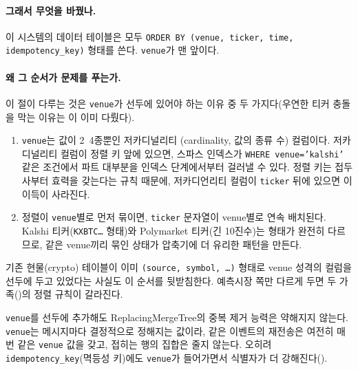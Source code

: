 \paragraph{그래서 무엇을 바꿨나.} 이 시스템의 데이터 테이블은 모두
\texttt{ORDER BY (venue, ticker, time, idempotency\_key)} 형태를 쓴다.
\texttt{venue}가 맨 앞이다.

\paragraph{왜 그 순서가 문제를 푸는가.} 이 절이 다루는 것은 \texttt{venue}가 선두에
있어야 하는 이유 중  두 가지다(우연한 티커 충돌을 막는 이유는
이 이미 다뤘다).

\begin{enumerate}
  \item {} \texttt{venue}는 값이 2~4종뿐인 저카디널리티
    (cardinality, 값의 종류 수) 컬럼이다. 저카디널리티 컬럼이 정렬 키 앞에 있으면,
    스파스 인덱스가 \texttt{WHERE venue='kalshi'} 같은 조건에서 파트 대부분을
    인덱스 단계에서부터 걸러낼 수 있다. 정렬 키는 접두사부터 효력을 갖는다는 규칙
    때문에, 저카디언리티 컬럼이 \texttt{ticker} 뒤에 있으면 이 이득이 사라진다.
  \item {} 정렬이 \texttt{venue}별로 먼저 묶이면, \texttt{ticker}
    문자열이 venue별로 연속 배치된다. Kalshi 티커(\texttt{KXBTC\ldots} 형태)와
    Polymarket 티커(긴 10진수)는 형태가 완전히 다르므로, 같은 venue끼리 묶인 상태가
    압축기에 더 유리한 패턴을 만든다.
\end{enumerate}

기존 현물(crypto) 테이블이 이미 \texttt{(source, symbol, \ldots)} 형태로 venue
성격의 컬럼을 선두에 두고 있었다는 사실도 이 순서를 뒷받침한다. 예측시장 쪽만
다르게 두면 두 가족()의 정렬 규칙이 갈라진다.

\begin{callout}
\texttt{venue}를 선두에 추가해도 ReplacingMergeTree의 중복 제거 능력은 약해지지
않는다. \texttt{venue}는 메시지마다 결정적으로 정해지는 값이라, 같은 이벤트의
재전송은 여전히 매번 같은 \texttt{venue} 값을 갖고, 접히는 행의 집합은 줄지 않는다.
오히려 \texttt{idempotency\_key}(멱등성 키)에도 \texttt{venue}가 들어가면서
식별자가 더 강해진다().
\end{callout}

